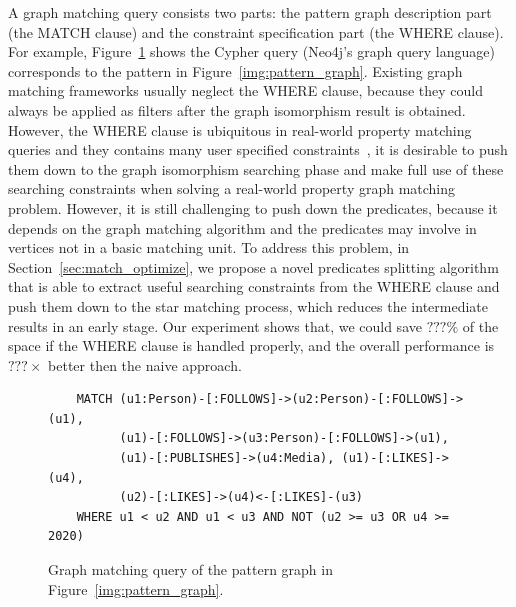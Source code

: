 A graph matching query consists two parts: the pattern graph description part (the MATCH clause) and the constraint specification part (the WHERE clause).
For example, Figure~\ref{img:cypher_query} shows the Cypher query (Neo4j's graph query language) corresponds to the pattern in Figure~\ref{img:pattern_graph}.
Existing graph matching frameworks usually neglect the WHERE clause,
because they could always be applied as filters after the graph isomorphism result is obtained.
However, the WHERE clause is ubiquitous in real-world property matching queries and they contains many user specified constraints~\cite{DBLP:journals/csur/AnglesABHRV17},
it is desirable to push them down to the graph isomorphism searching phase and make full use of these searching constraints when solving a real-world property graph matching problem.
However, it is still challenging to push down the predicates, because it depends on the graph matching algorithm and the predicates may involve in vertices not in a basic matching unit.
To address this problem, in Section~\ref{sec:match_optimize}, we propose a novel predicates splitting algorithm that is able to extract useful searching constraints from the WHERE clause and push them down to the star matching process,
which reduces the intermediate results in an early stage.
Our experiment shows that, we could save $???\%$ of the space if the WHERE clause is handled properly,
and the overall performance is $???\times$ better then the naive approach.
\begin{figure}[ht]
  \begin{verbatim}
    MATCH (u1:Person)-[:FOLLOWS]->(u2:Person)-[:FOLLOWS]->(u1),
          (u1)-[:FOLLOWS]->(u3:Person)-[:FOLLOWS]->(u1),
          (u1)-[:PUBLISHES]->(u4:Media), (u1)-[:LIKES]->(u4),
          (u2)-[:LIKES]->(u4)<-[:LIKES]-(u3)
    WHERE u1 < u2 AND u1 < u3 AND NOT (u2 >= u3 OR u4 >= 2020)
  \end{verbatim}
  \caption{Graph matching query of the pattern graph in Figure~\ref{img:pattern_graph}.}\label{img:cypher_query}
\end{figure}
